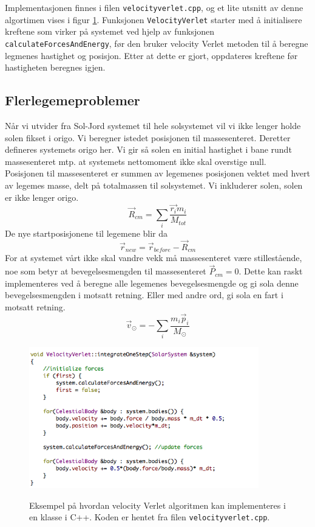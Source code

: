 \documentclass[11pt,a4paper]{article}
\begin{document}
Implementasjonen finnes i filen \texttt{velocityverlet.cpp}, og et lite utsnitt av denne algortimen vises i figur \ref{vv}. Funksjonen \texttt{VelocityVerlet} starter med å initialisere kreftene som virker på systemet ved hjelp av funksjonen \texttt{calculateForcesAndEnergy}, før den bruker velocity Verlet metoden til å beregne legmenes hastighet og posisjon. Etter at dette er gjort, oppdateres kreftene før hastigheten beregnes igjen.
\subsection{Flerlegemeproblemer}
Når vi utvider fra Sol-Jord systemet til hele solsystemet vil vi ikke lenger holde solen fikset i origo. Vi beregner istedet posisjonen til massesenteret. Deretter defineres systemets origo her. Vi gir så solen en initial hastighet i bane rundt massesenteret 
mtp. at systemets nettomoment ikke skal overstige null.	\\

Posisjonen til massesenteret er summen av legemenes posisjonen vektet med hvert av legemes masse, delt på totalmassen til solsystemet. Vi inkluderer solen, solen er ikke lenger origo.
\begin{equation}
 \vec{R}_{cm} = \sum_i \frac{\vec{r_i}m_i}{M_{tot}}
\end{equation}
De nye startposisjonene til legemene blir da $$\vec{r}_{new} = \vec{r}_{before} - \vec{R}_{cm}$$
For at systemet vårt ikke skal vandre vekk må massesenteret være stillestående, noe som betyr at bevegelsesmengden til massesenteret $\vec{P}_{cm} = 0$.
Dette kan raskt implementeres ved å beregne alle legemenes bevegelsesmengde og gi sola denne bevegelsesmengden i motsatt retning. Eller med andre ord, gi sola en fart i motsatt retning.
\begin{equation}
 \vec{v}_{\odot} = -\sum_i \frac{m_i\vec{p}_{i}}{M_{\odot}}
\end{equation}


\FloatBarrier
\begin{figure}[!ht]
\begin{center}
  \includegraphics[width = 100mm]{vv.png}\\
  \caption{Eksempel på hvordan velocity Verlet algoritmen kan implementeres i en klasse i C++. Koden er hentet fra filen \texttt{velocityverlet.cpp}.}   \label{vv}
  \end{center}
  \end{figure}
\FloatBarrier
\end{document}
